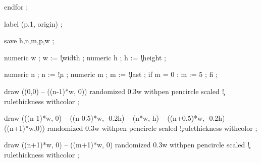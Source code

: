   endfor ;

  label (p.1, origin) ;

\stopuseMPgraphic




  save h,n,m,p,w ;

  numeric w ; w := \visualcounterparameter\c!width ;
  numeric h ; h := \visualcounterparameter\c!height ;

  numeric n ; n := \visualcounterparameter\c!n ;
  numeric m ; m := \visualcounterparameter\c!last ;
  if m = 0 : m := 5 ; fi ;

  draw ((0,0) -- ((n-1)*w, 0)) 
      randomized 0.3w
      withpen pencircle scaled \visualcounterparameter\c!rulethickness\space
      withcolor  ;

  draw (((n-1)*w, 0) -- ((n-0.5)*w, -0.2h) -- (n*w, h) -- ((n+0.5)*w, -0.2h) -- ((n+1)*w,0))
      randomized 0.3w
      withpen pencircle scaled \visualcounterparameter\c!rulethickness\space
      withcolor  ;

  draw ((n+1)*w, 0) -- ((m+1)*w, 0)
      randomized 0.3w
      withpen pencircle scaled \visualcounterparameter\c!rulethickness\space
      withcolor  ;

\stopuseMPgraphic


\protect
